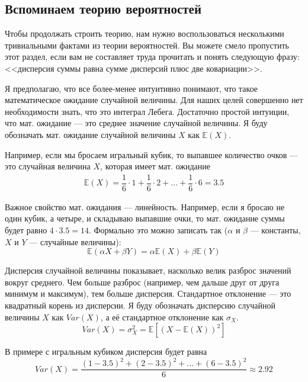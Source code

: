 \subsection{Вспоминаем теорию вероятностей}

Чтобы продолжать строить теорию, нам нужно воспользоваться несколькими 
тривиальными фактами из теории вероятностей. Вы можете смело пропустить этот 
раздел, если вам не составляет труда прочитать и понять следующую фразу: 
<<дисперсия суммы равна сумме дисперсий плюс две ковариации>>.

Я предполагаю, что все более-менее интуитивно понимают, что такое 
математическое ожидание случайной величины. Для наших целей совершенно нет 
необходимости знать, что это интеграл Лебега. Достаточно простой интуиции, что 
мат. ожидание --- это среднее значение случайной величины. Я буду обозначать 
мат. ожидание случайной величины $X$ как $\mathbb{E}(X)$.

Например, если мы бросаем игральный кубик, то выпавшее количество очков --- это 
случайная величина $X$, которая имеет мат. ожидание
\begin{align*}
\mathbb{E}(X) = \dfrac{1}{6}\cdot 1 + \dfrac{1}{6}\cdot 2
+ ... + \dfrac{1}{6}\cdot 6 = 3.5
\end{align*}

Важное свойство мат. ожидания --- линейность. Например, если я бросаю не один 
кубик, а четыре, и складываю выпавшие очки, то мат. ожидание суммы будет равно 
$4 \cdot 3.5 =  14$. Формально это можно записать так ($\alpha$ и $\beta$ --- 
константы, $X$ и $Y$ --- случайные величины):
\begin{equation*}
\mathbb{E}(\alpha X + \beta Y) = \alpha\mathbb{E}(X) + \beta\mathbb{E}(Y)
\end{equation*}

Дисперсия случайной величины показывает, насколько велик разброс значений вокруг 
среднего. Чем больше разброс (например, чем дальше друг от друга минимум и 
максимум), тем больше дисперсия. Стандартное отклонение --- это квадратный 
корень из дисперсии. Я буду обозначать дисперсию случайной величины $X$ как  
$Var(X)$, а её стандартное отклонение как $\sigma_X$.
\begin{equation*}
Var(X) = \sigma_X^2 = \mathbb{E}\left[(X - \mathbb{E}(X))^2 \right]
\end{equation*}

В примере с игральным кубиком дисперсия будет равна
\begin{equation*}
Var(X) = \dfrac{(1 - 3.5)^2 + (2 - 3.5)^2 + ... + (6 - 3.5)^2}{6} \approx 2.92
\end{equation*}

